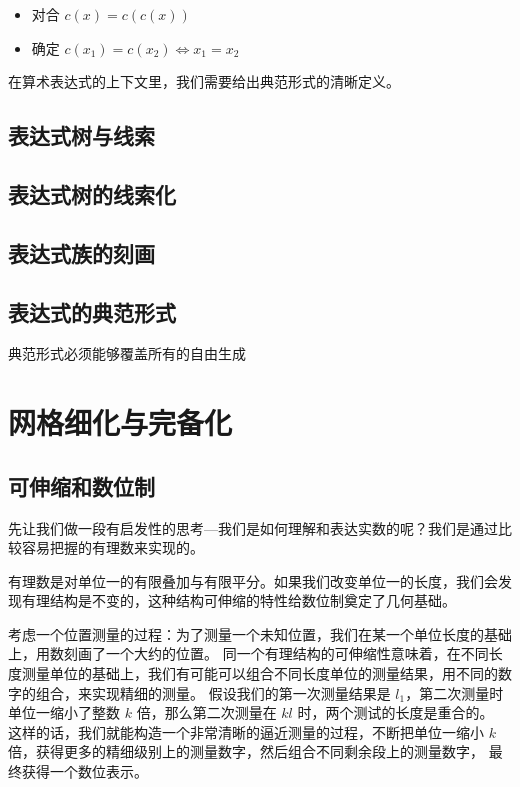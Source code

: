 \documentclass[a4paper,12pt]{article}
\numberwithin{definition}{section}
\numberwithin{lemma}{section}
\numberwithin{proposition}{section}
\numberwithin{theorem}{section}
\numberwithin{grammar}{section}
\numberwithin{program}{section}
\numberwithin{convention}{section}
\numberwithin{corollary}{section}
\begin{document}
\begin{itemize}
    \item 对合 $  c(x) = c(c(x)) $
    \item 确定 $  c(x_1) = c(x_2) \iff x_1 = x_2  $
\end{itemize}

在算术表达式的上下文里，我们需要给出典范形式的清晰定义。

\subsection{表达式树与线索}

\subsection{表达式树的线索化}

\subsection{表达式族的刻画}

\subsection{表达式的典范形式}

典范形式必须能够覆盖所有的自由生成

\newpage

\section{网格细化与完备化}\label{subsec:completeness}

\subsection{可伸缩和数位制}

先让我们做一段有启发性的思考—我们是如何理解和表达实数的呢？我们是通过比较容易把握的有理数来实现的。

有理数是对单位一的有限叠加与有限平分。如果我们改变单位一的长度，我们会发现有理结构是不变的，这种结构可伸缩的特性给数位制奠定了几何基础。

考虑一个位置测量的过程：为了测量一个未知位置，我们在某一个单位长度的基础上，用数刻画了一个大约的位置。
同一个有理结构的可伸缩性意味着，在不同长度测量单位的基础上，我们有可能可以组合不同长度单位的测量结果，用不同的数字的组合，来实现精细的测量。
假设我们的第一次测量结果是 $l_1$，第二次测量时单位一缩小了整数 $k$ 倍，那么第二次测量在 $kl$ 时，两个测试的长度是重合的。
这样的话，我们就能构造一个非常清晰的逼近测量的过程，不断把单位一缩小 $k$ 倍，获得更多的精细级别上的测量数字，然后组合不同剩余段上的测量数字，
最终获得一个数位表示。
\end{document}
